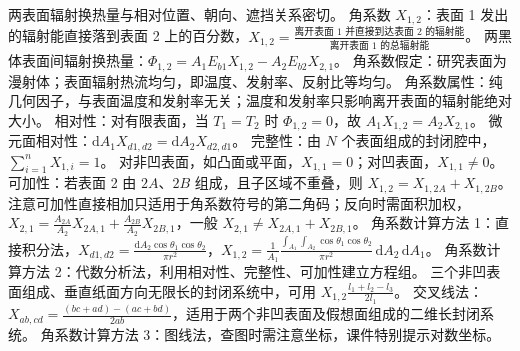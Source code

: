 \divider



两表面辐射换热量与相对位置、朝向、遮挡关系密切。 角系数 $X_{1,2}$：表面 1 发出的辐射能直接落到表面 2 上的百分数，$X_{1,2}=\frac{\text{离开表面 1 并直接到达表面 2 的辐射能}}{\text{离开表面 1 的总辐射能}}$。
两黑体表面间辐射换热量：$\Phi_{1,2}=A_1E_{b1}X_{1,2}-A_2E_{b2}X_{2,1}$。
角系数假定：研究表面为漫射体；表面辐射热流均匀，即温度、发射率、反射比等均匀。
角系数属性：纯几何因子，与表面温度和发射率无关；温度和发射率只影响离开表面的辐射能绝对大小。
相对性：对有限表面，当 $T_1=T_2$ 时 $\Phi_{1,2}=0$，故 $A_1X_{1,2}=A_2X_{2,1}$。
微元面相对性：$\mathrm{d}A_1X_{d1,d2}=\mathrm{d}A_2X_{d2,d1}$。
完整性：由 $N$ 个表面组成的封闭腔中，$\sum_{i=1}^n X_{1,i}=1$。
对非凹表面，如凸面或平面，$X_{1,1}=0$；对凹表面，$X_{1,1}\ne0$。
可加性：若表面 2 由 $2A$、$2B$ 组成，且子区域不重叠，则 $X_{1,2}=X_{1,2A}+X_{1,2B}$。
注意可加性直接相加只适用于角系数符号的第二角码；反向时需面积加权，$X_{2,1}=\frac{A_{2A}}{A_2}X_{2A,1}+\frac{A_{2B}}{A_2}X_{2B,1}$，一般 $X_{2,1}\ne X_{2A,1}+X_{2B,1}$。
角系数计算方法 1：直接积分法，$X_{d1,d2}=\frac{\mathrm{d}A_2\cos\theta_1\cos\theta_2}{\pi r^2}$，$X_{1,2}=\frac{1}{A_1}\frac{\int_{A_1}\int_{A_2}\cos\theta_1\cos\theta_2}{\pi r^2}\,\mathrm{d}A_2\,\mathrm{d}A_1$。
角系数计算方法 2：代数分析法，利用相对性、完整性、可加性建立方程组。
三个非凹表面组成、垂直纸面方向无限长的封闭系统中，可用 $X_{1,2}\frac{l_1+l_2-l_3}{2l_1}$。
交叉线法：$X_{ab,cd}=\frac{(bc+ad)-(ac+bd)}{2ab}$，适用于两个非凹表面及假想面组成的二维长封闭系统。
角系数计算方法 3：图线法，查图时需注意坐标，课件特别提示对数坐标。

\divider


